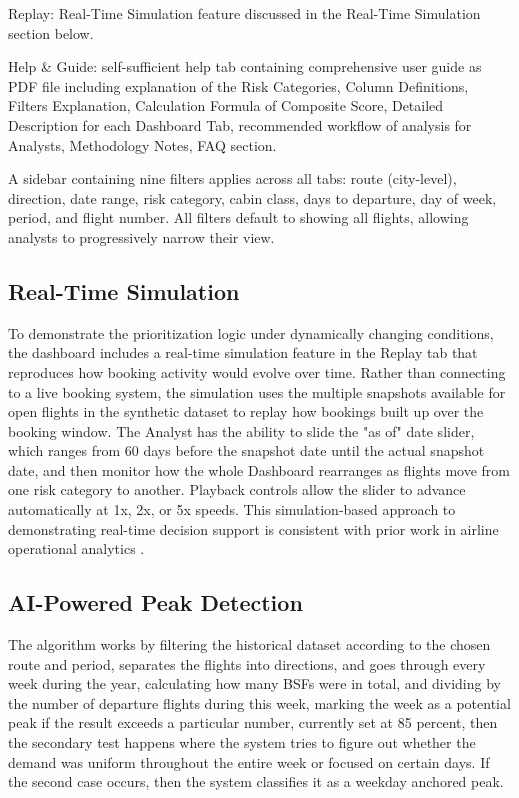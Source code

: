 Replay: Real-Time Simulation feature discussed in the Real-Time Simulation section below.

Help \& Guide: self-sufficient help tab containing comprehensive user guide as PDF file including explanation of the Risk Categories, Column Definitions, Filters Explanation, Calculation Formula of Composite Score, Detailed Description for each Dashboard Tab, recommended workflow of analysis for Analysts, Methodology Notes, FAQ section.

A sidebar containing nine filters applies across all tabs: route (city-level), direction, date range, risk category, cabin class, days to departure, day of week, period, and flight number. All filters default to showing all flights, allowing analysts to progressively narrow their view.

\subsection{Real-Time Simulation}

To demonstrate the prioritization logic under dynamically changing conditions, the dashboard includes a real-time simulation feature in the Replay tab that reproduces how booking activity would evolve over time. Rather than connecting to a live booking system, the simulation uses the multiple snapshots available for open flights in the synthetic dataset to replay how bookings built up over the booking window. The Analyst has the ability to slide the "as of" date slider, which ranges from 60 days before the snapshot date until the actual snapshot date, and then monitor how the whole Dashboard rearranges as flights move from one risk category to another. Playback controls allow the slider to advance automatically at 1x, 2x, or 5x speeds. This simulation-based approach to demonstrating real-time decision support is consistent with prior work in airline operational analytics \citep{Rakshit1996, Watson2006}.

\subsection{AI-Powered Peak Detection}

The algorithm works by filtering the historical dataset according to the chosen route and period, separates the flights into directions, and goes through every week during the year, calculating how many BSFs were in total, and dividing by the number of departure flights during this week, marking the week as a potential peak if the result exceeds a particular number, currently set at 85 percent, then the secondary test happens where the system tries to figure out whether the demand was uniform throughout the entire week or focused on certain days. If the second case occurs, then the system classifies it as a weekday anchored peak.

